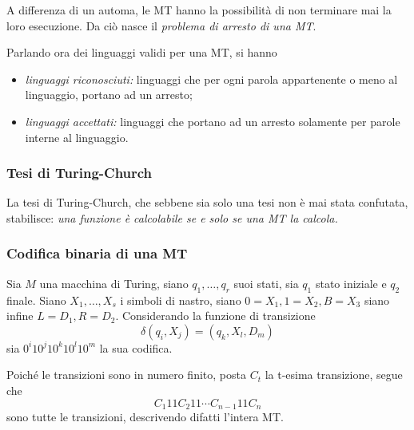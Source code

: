 \documentclass{subfiles}
\begin{document}
A differenza di un automa, le MT hanno la possibilità di non terminare mai la loro esecuzione.
Da ciò nasce il \emph{problema di arresto di una MT}.

\noindent Parlando ora dei linguaggi validi per una MT, si hanno
\begin{itemize}
    \item \emph{linguaggi riconosciuti:} linguaggi che per ogni parola appartenente o meno al linguaggio, portano ad un arresto;
    \item \emph{linguaggi accettati:} linguaggi che portano ad un arresto solamente per parole interne al linguaggio.
\end{itemize}

\subsubsection{Tesi di Turing-Church}
La tesi di Turing-Church, che sebbene sia solo una tesi non è mai stata confutata, stabilisce: \emph{una funzione è calcolabile se e solo se una MT la calcola.}

\subsubsection{Codifica binaria di una MT}
Sia \(M\) una macchina di Turing, siano \(q_{1}, \ldots, q_{r}\) suoi stati, sia \(q_{1}\) stato iniziale e \(q_{2}\) finale.
Siano \(X_{1}, \ldots, X_{s}\) i simboli di nastro, siano \(0 = X_{1}, 1 = X_{2}, B = X_{3}\) siano infine \(L = D_{1}, R = D_{2}\).
Considerando la funzione di transizione
\[
    \delta(q_{i}, X_{j}) = (q_{k}, X_{l}, D_{m})
\]
sia \(0^{i}10^{j}10^{k}10^{l}10^{m}\) la sua codifica.

\noindent Poiché le transizioni sono in numero finito, posta \(C_{t}\) la t-esima transizione, segue che
\[
    C_{1}11C_{2}11 \cdots C_{n - 1} 11 C_{n}
\]
sono tutte le transizioni, descrivendo difatti l'intera MT.
\end{document}
